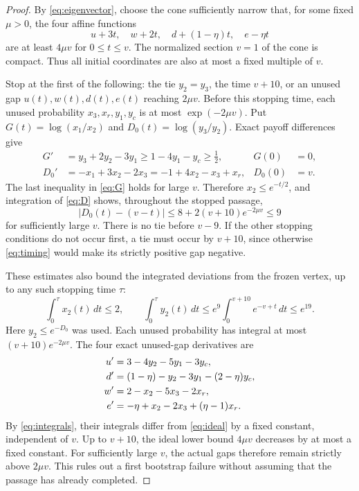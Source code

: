 \documentclass[11pt,a4paper]{article}
\numberwithin{equation}{section}
\theoremstyle{definition}
\begin{document}
\begin{proof}
By \eqref{eq:eigenvector}, choose the cone sufficiently narrow that,
for some fixed \(\mu>0\), the four affine functions
\begin{equation}\label{eq:ideal}
 u+3t,\quad w+2t,\quad d+(1-\eta)t,\quad e-\eta t
\end{equation}
are at least \(4\mu v\) for \(0\le t\le v\). The normalized
section \(v=1\) of the cone is compact. Thus all initial coordinates
are also at most a fixed multiple of \(v\).

Stop at the first of the following: the tie \(y_2=y_3\), the time
\(v+10\), or an unused gap \(u(t),w(t),d(t),e(t)\) reaching
\(2\mu v\). Before this stopping time, each unused probability
\(x_3,x_r,y_1,y_c\) is at most \(\exp(-2\mu v)\).
Put \(G(t)=\log(x_1/x_2)\) and
\(D_0(t)=\log(y_3/y_2)\). Exact payoff differences give
\begin{align}
 G'&=y_3+2y_2-3y_1\ge1-4y_1-y_c\ge\tfrac12,
       &G(0)&=0,\label{eq:G}\\
 D_0'&=-x_1+3x_2-2x_3
       =-1+4x_2-x_3+x_r,
       &D_0(0)&=v.\label{eq:D}
\end{align}
The last inequality in \eqref{eq:G} holds for large \(v\).
Therefore \(x_2\le e^{-t/2}\), and integration of \eqref{eq:D}
shows, throughout the stopped passage,
\begin{equation}\label{eq:timing}
 |D_0(t)-(v-t)|\le8+2(v+10)e^{-2\mu v}\le9
\end{equation}
for sufficiently large \(v\). There is no tie before \(v-9\).
If the other stopping conditions do not occur first, a tie must occur
by \(v+10\), since otherwise \eqref{eq:timing} would make its
strictly positive gap negative.

These estimates also bound the integrated deviations from the frozen
vertex, up to any such stopping time \(\tau\):
\begin{equation}\label{eq:integrals}
 \int_0^\tau x_2(t)\,dt\le2,\qquad
 \int_0^\tau y_2(t)\,dt\le
 e^9\int_0^{v+10}e^{-v+t}\,dt\le e^{19}.
\end{equation}
Here \(y_2\le e^{-D_0}\) was used. Each unused probability has
integral at most \((v+10)e^{-2\mu v}\).
The four exact unused-gap derivatives are
\begin{align}
 u'&=3-4y_2-5y_1-3y_c,\label{eq:unused}\\
 d'&=(1-\eta)-y_2-3y_1-(2-\eta)y_c,\notag\\
 w'&=2-x_2-5x_3-2x_r,\notag\\
 e'&=-\eta+x_2-2x_3+(\eta-1)x_r.\notag
\end{align}
By \eqref{eq:integrals}, their integrals differ from
\eqref{eq:ideal} by a fixed constant, independent of \(v\).
Up to \(v+10\), the ideal lower bound \(4\mu v\) decreases by
at most a fixed constant. For sufficiently large \(v\), the actual
gaps therefore remain strictly above \(2\mu v\). This rules out a
first bootstrap failure without assuming that the passage has already
completed.


\end{proof}
\end{document}
